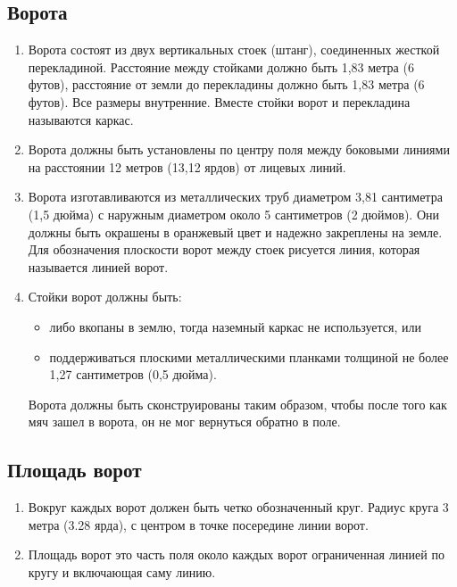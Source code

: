 \documentclass[../main.tex]{subfiles}
\begin{document}
\subsection{Ворота}
\begin{enumerate}
\item Ворота состоят из двух вертикальных стоек (штанг), соединенных жесткой перекладиной.\newline
Расстояние между стойками должно быть 1,83 метра (6 футов), расстояние от земли до перекладины должно быть 1,83 метра (6 футов). Все размеры внутренние.\newline
Вместе стойки ворот и перекладина называются каркас.

\item Ворота должны быть установлены по центру поля между боковыми линиями на расстоянии 12 метров (13,12 ярдов) от лицевых линий.

\item Ворота изготавливаются из металлических труб диаметром 3,81 сантиметра (1,5 дюйма) с наружным диаметром около 5 сантиметров (2 дюймов).\newline
Они должны быть окрашены в оранжевый цвет и надежно закреплены на земле.\newline
Для обозначения плоскости ворот между стоек рисуется линия, которая называется линией ворот.

\item Стойки ворот должны быть:
\begin{itemize}
  \item либо вкопаны в землю, тогда наземный каркас не используется, или
  \item поддерживаться плоскими металлическими планками толщиной не более 1,27 сантиметров (0,5 дюйма).
\end{itemize}

Ворота должны быть сконструированы таким образом, чтобы после того как мяч зашел в ворота, он не мог вернуться обратно в поле.
\end{enumerate}

\subsection{Площадь ворот}
\begin{enumerate}
  \item Вокруг каждых ворот должен быть четко обозначенный круг.\newline
  Радиус круга 3 метра (3.28 ярда), с центром в точке посередине линии ворот.
  \item Площадь ворот это часть поля около каждых ворот ограниченная линией по кругу и включающая саму линию.
\end{enumerate}
\end{document}

